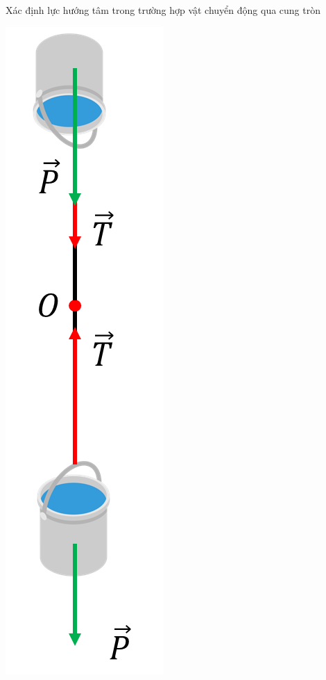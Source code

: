 \begin{dang}{Xác định lực hướng tâm trong trường hợp vật chuyển động qua cung tròn}
{{\begin{minipage}[l]{0.3\textwidth}
\begin{center}
					\includegraphics[width=0.3\linewidth]{../figs/VN10-2023-PH-TP032-1}
				\end{center}
		\end{minipage}}
		
}
\end{dang}
